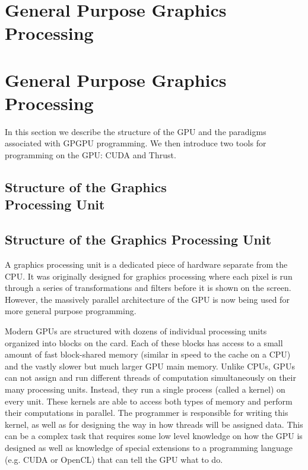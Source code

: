 \documentclass[twocolumn]{article}
\renewcommand{\|}{\origbar} %
\begin{document}
\if@twocolumn
  \section{General Purpose Graphics \\ Processing}
\else
  \section{General Purpose Graphics Processing}
\fi 
\label{sec:GPGP}

In this section we describe the structure of the GPU and the paradigms associated with GPGPU programming. We then introduce two tools for programming on the GPU: CUDA and Thrust.

\if@twocolumn
  \subsection{Structure of the Graphics \\ Processing Unit}
\else
  \subsection{Structure of the Graphics Processing Unit}
\fi

A graphics processing unit is a dedicated piece of hardware separate from the CPU. It was originally designed for graphics processing where each pixel is run through a series of transformations and filters before it is shown on the screen. However, the massively parallel architecture of the GPU is now being used for more general purpose programming. 

Modern GPUs are structured with dozens of individual processing units organized into blocks on the card. Each of these blocks has access to a small amount of fast block-shared memory (similar in speed to the cache on a CPU) and the vastly slower but much larger GPU main memory. Unlike CPUs, GPUs can not assign and run different threads of computation simultaneously on their many processing units. Instead, they run a single process (called a kernel) on every unit. These kernels are able to access both types of memory and perform their computations in parallel. The programmer is responsible for writing this kernel, as well as for designing the way in how threads will be assigned data. This can be a complex task that requires some low level knowledge on how the GPU is designed as well as knowledge of special extensions to a programming language (e.g. CUDA or OpenCL) that can tell the GPU what to do.
\end{document}
